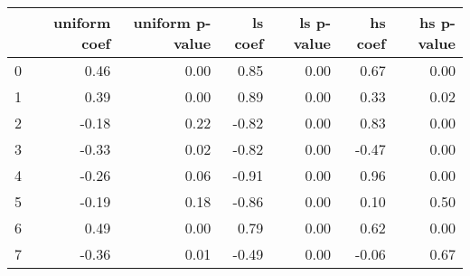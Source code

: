 \begin{tabular}{lrrrrrr}
\toprule
 & uniform coef & uniform p-value & ls coef & ls p-value & hs coef & hs p-value \\
\midrule
0 & 0.46 & 0.00 & 0.85 & 0.00 & 0.67 & 0.00 \\
1 & 0.39 & 0.00 & 0.89 & 0.00 & 0.33 & 0.02 \\
2 & -0.18 & 0.22 & -0.82 & 0.00 & 0.83 & 0.00 \\
3 & -0.33 & 0.02 & -0.82 & 0.00 & -0.47 & 0.00 \\
4 & -0.26 & 0.06 & -0.91 & 0.00 & 0.96 & 0.00 \\
5 & -0.19 & 0.18 & -0.86 & 0.00 & 0.10 & 0.50 \\
6 & 0.49 & 0.00 & 0.79 & 0.00 & 0.62 & 0.00 \\
7 & -0.36 & 0.01 & -0.49 & 0.00 & -0.06 & 0.67 \\
\bottomrule
\end{tabular}
